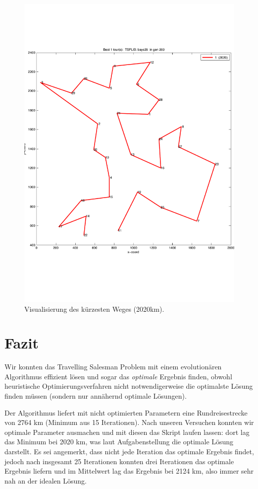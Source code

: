 \begin{figure}[!h] \centering
  \includegraphics[width=1.0\textwidth]{Figures/path.pdf}
  \caption{Visualisierung des kürzesten Weges (2020km).}
  \label{fig.optPath}
\end{figure}



\section{Fazit}\label{conclusion}

Wir konnten das Travelling Salesman Problem
mit einem evolutionären Algorithmus effizient lösen
und sogar das \emph{optimale} Ergebnis finden, obwohl heuristische
Optimierungsverfahren nicht notwendigerweise die optimalste Lösung finden müssen
(sondern nur annähernd optimale Lösungen).

Der Algorithmus liefert mit nicht optimierten Parametern eine Rundreisestrecke
von 2764 km (Minimum aus 15 Iterationen).
Nach unseren Versuchen konnten wir optimale Parameter ausmachen und mit diesen
das Skript laufen lassen: dort lag das Minimum bei 2020 km, was laut Aufgabenstellung
die optimale Lösung darstellt.
Es sei angemerkt, dass nicht jede Iteration das optimale Ergebnis findet,
jedoch nach insgesamt 25 Iterationen konnten drei Iterationen das optimale
Ergebnis liefern und im Mittelwert lag das Ergebnis bei 2124 km,
also immer sehr nah an der idealen Lösung.

